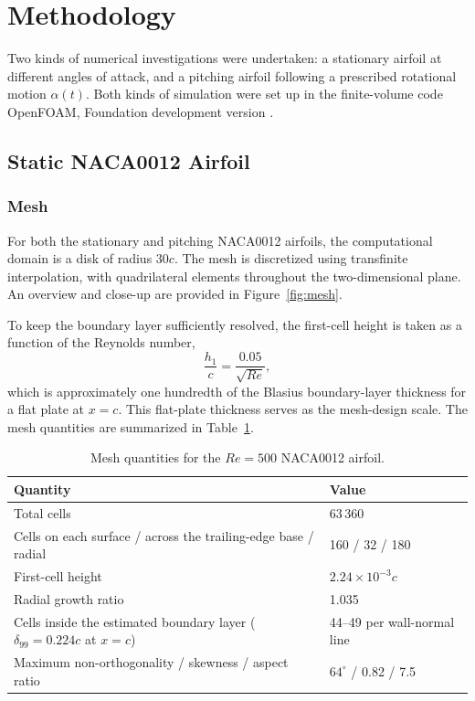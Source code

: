 \section{Methodology}
Two kinds of numerical investigations were undertaken: a stationary airfoil at different angles of attack, and a pitching airfoil following a prescribed rotational motion $\alpha(t)$. Both kinds of simulation were set up in the finite-volume code OpenFOAM, Foundation development version \cite{weller}.

\subsection{Static NACA0012 Airfoil}
\subsubsection{Mesh}
For both the stationary and pitching NACA0012 airfoils, the computational domain is a disk of radius $30c$. The mesh is discretized using transfinite interpolation, with quadrilateral elements throughout the two-dimensional plane. An overview and close-up are provided in Figure~\ref{fig:mesh}.


To keep the boundary layer sufficiently resolved, the first-cell height is taken as a function of the Reynolds number,
\begin{equation}
\frac{h_1}{c}=\frac{0.05}{\sqrt{Re}},
\end{equation}
which is approximately one hundredth of the Blasius boundary-layer thickness for a flat plate at $x=c$. This flat-plate thickness serves as the mesh-design scale. The mesh quantities are summarized in Table~\ref{tab:mesh}.

\begin{table}[htbp]\centering\small
\caption{Mesh quantities for the $Re=500$ NACA0012 airfoil.}\label{tab:mesh}
\begin{tabularx}{\linewidth}{@{}>{\raggedright\arraybackslash}p{.57\linewidth}X@{}}
\toprule Quantity & Value \\
\midrule
Total cells & 63\,360 \\
Cells on each surface / across the trailing-edge base / radial & 160 / 32 / 180 \\
First-cell height & $2.24\times10^{-3}c$ \\
Radial growth ratio & 1.035 \\
Cells inside the estimated boundary layer ($\delta_{99}=0.224c$ at $x=c$) & 44--49 per wall-normal line \\
Maximum non-orthogonality / skewness / aspect ratio & $64^\circ$ / 0.82 / 7.5 \\
\bottomrule
\end{tabularx}
\end{table}

